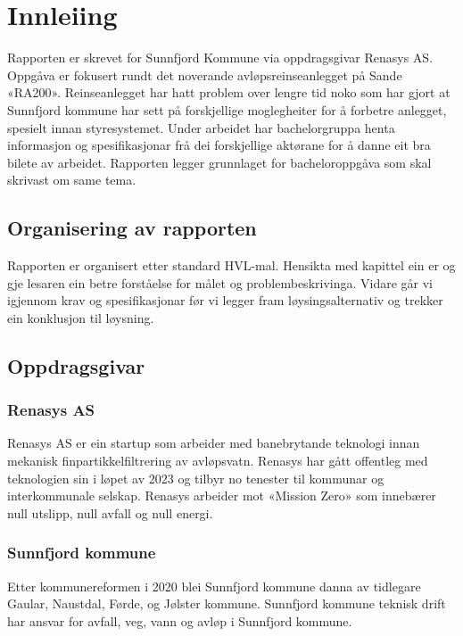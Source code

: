 \chapter{Innleiing}
\thispagestyle{fancy}
Rapporten er skrevet for Sunnfjord Kommune via oppdragsgivar Renasys AS.
Oppgåva er fokusert rundt det noverande avløpsreinseanlegget på Sande «RA200». Reinseanlegget har hatt 
problem over lengre tid noko som har gjort at Sunnfjord kommune har sett på forskjellige moglegheiter for å 
forbetre anlegget, spesielt innan styresystemet.
Under arbeidet har bachelorgruppa henta informasjon og spesifikasjonar frå dei forskjellige aktørane for å 
danne eit bra bilete av arbeidet. Rapporten legger grunnlaget for bacheloroppgåva som skal skrivast om same 
tema.

\newpage
\section{Organisering av rapporten}
Rapporten er organisert etter standard HVL-mal.
Hensikta med kapittel ein er og gje lesaren ein betre forståelse for målet og problembeskrivinga. 
Vidare går vi igjennom krav og spesifikasjonar før vi legger fram løysingsalternativ og trekker ein konklusjon til løysning.

\section{Oppdragsgivar}

\subsection{Renasys AS}
Renasys AS er ein startup som arbeider med banebrytande teknologi innan mekanisk finpartikkelfiltrering av avløpsvatn. 
Renasys har gått offentleg med teknologien sin i løpet av 2023 og tilbyr no tenester til kommunar og interkommunale selskap. 
Renasys arbeider mot «Mission Zero» som innebærer null utslipp, null avfall og null energi.

\subsection{Sunnfjord kommune}
Etter kommunereformen i 2020 blei Sunnfjord kommune danna av tidlegare Gaular, Naustdal, Førde, og Jølster kommune. Sunnfjord kommune teknisk drift har ansvar for avfall, veg, vann og avløp i Sunnfjord kommune.